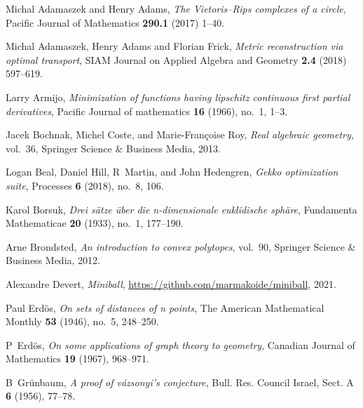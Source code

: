 \documentclass[12pt]{amsart}
\theoremstyle{plain}
\numberwithin{equation}{section}
\begin{document}
\providecommand{\bysame}{\leavevmode\hbox to3em{\hrulefill}\thinspace}
\providecommand{\MR}{\relax\ifhmode\unskip\space\fi MR }
\providecommand{\MRhref}[2]{%
	\href{http://www.ams.org/mathscinet-getitem?mr=#1}{#2}
}
\providecommand{\href}[2]{#2}
\begin{thebibliography}{Kat89}


 Michal Adamaszek and Henry Adams, \emph{The Vietoris–Rips complexes of a circle}, Pacific Journal of
Mathematics \textbf{290.1} (2017) 1--40.

 Michal Adamaszek, Henry Adams and Florian Frick, \emph{Metric reconstruction via optimal transport}, SIAM
Journal on Applied Algebra and Geometry \textbf{2.4} (2018) 597--619.

	Larry Armijo, \emph{Minimization of functions having lipschitz continuous first
	  partial derivatives}, Pacific Journal of mathematics \textbf{16} (1966),
	  no.~1, 1--3.
	
	Jacek Bochnak, Michel Coste, and Marie-Fran{\c{c}}oise Roy, \emph{Real
	  algebraic geometry}, vol.~36, Springer Science \& Business Media, 2013.

	  Logan Beal, Daniel Hill, R~Martin, and John Hedengren, \emph{Gekko optimization
		suite}, Processes \textbf{6} (2018), no.~8, 106.
	
	Karol Borsuk, \emph{Drei s{\"a}tze {\"u}ber die n-dimensionale euklidische
	  sph{\"a}re}, Fundamenta Mathematicae \textbf{20} (1933), no.~1, 177--190.
	
	Arne Brondsted, \emph{An introduction to convex polytopes}, vol.~90, Springer
	  Science \& Business Media, 2012.

	Alexandre Devert, \emph{Miniball},
	\url{https://github.com/marmakoide/miniball}, 2021.
	
	Paul Erd{\"o}s, \emph{On sets of distances of n points}, The American
	  Mathematical Monthly \textbf{53} (1946), no.~5, 248--250.
	
	P~Erd{\"o}s, \emph{On some applications of graph theory to geometry}, Canadian
	  Journal of Mathematics \textbf{19} (1967), 968--971.
	
	B~Gr{\"u}nbaum, \emph{A proof of v{\'a}zsonyi’s conjecture}, Bull. Res.
	  Council Israel, Sect. A \textbf{6} (1956), 77--78.
	

\end{thebibliography}
\end{document}
